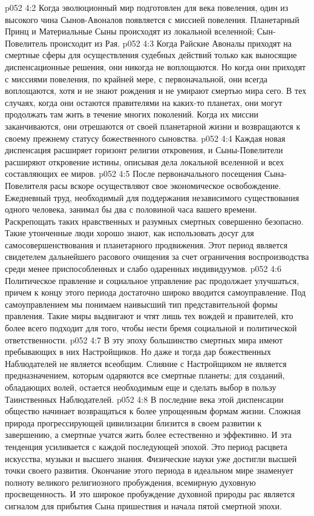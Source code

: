 \vs p052 4:2 \pc Когда эволюционный мир подготовлен для века повеления, один из высокого чина Сынов\hyp{}Авоналов появляется с миссией повеления. Планетарный Принц и Материальные Сыны происходят из локальной вселенной; Сын\hyp{}Повелитель происходит из Рая.
\vs p052 4:3 Когда Райские Авоналы приходят на смертные сферы для осуществления судебных действий только как выносящие диспенсационные решения, они никогда не воплощаются. Но когда они приходят с миссиями повеления, по крайней мере, с первоначальной, они всегда воплощаются, хотя и не знают рождения и не умирают смертью мира сего. В тех случаях, когда они остаются правителями на каких\hyp{}то планетах, они могут продолжать там жить в течение многих поколений. Когда их миссии заканчиваются, они отрешаются от своей планетарной жизни и возвращаются к своему прежнему статусу божественного сыновства.
\vs p052 4:4 Каждая новая диспенсация расширяет горизонт религии откровения, и Сыны\hyp{}Повелители расширяют откровение истины, описывая дела локальной вселенной и всех составляющих ее миров.
\vs p052 4:5 \pc После первоначального посещения Сына\hyp{}Повелителя расы вскоре осуществляют свое экономическое освобождение. Ежедневный труд, необходимый для поддержания независимого существования одного человека, занимал бы два с половиной часа вашего времени. Раскрепощать таких нравственных и разумных смертных совершенно безопасно. Такие утонченные люди хорошо знают, как использовать досуг для самосовершенствования и планетарного продвижения. Этот период является свидетелем дальнейшего расового очищения за счет ограничения воспроизводства среди менее приспособленных и слабо одаренных индивидуумов.
\vs p052 4:6 Политическое правление и социальное управление рас продолжает улучшаться, причем к концу этого периода достаточно широко вводится самоуправление. Под самоуправлением мы понимаем наивысший тип представительной формы правления. Такие миры выдвигают и чтят лишь тех вождей и правителей, кто более всего подходит для того, чтобы нести бремя социальной и политической ответственности.
\vs p052 4:7 В эту эпоху большинство смертных мира имеют пребывающих в них Настройщиков. Но даже и тогда дар божественных Наблюдателей не является всеобщим. Слияние с Настройщиком не является предназначением, которым одаряются все смертные планеты; для созданий, обладающих волей, остается необходимым еще и сделать выбор в пользу Таинственных Наблюдателей.
\vs p052 4:8 В последние века этой диспенсации общество начинает возвращаться к более упрощенным формам жизни. Сложная природа прогрессирующей цивилизации близится в своем развитии к завершению, а смертные учатся жить более естественно и эффективно. И эта тенденция усиливается с каждой последующей эпохой. Это период расцвета искусства, музыки и высшего знания. Физические науки уже достигли высшей точки своего развития. Окончание этого периода в идеальном мире знаменует полноту великого религиозного пробуждения, всемирную духовную просвещенность. И это широкое пробуждение духовной природы рас является сигналом для прибытия Сына пришествия и начала пятой смертной эпохи.
